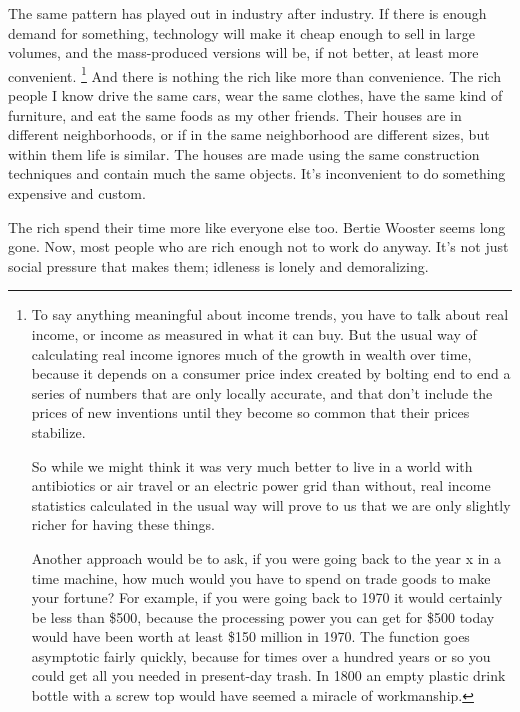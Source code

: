 \documentclass[12pt]{book}
\begin{document}
The same pattern has played out in industry after industry. If there is
enough demand for something, technology will make it cheap enough to
sell in large volumes, and the mass-produced versions will be, if not
better, at least more convenient. \footnote{To say anything meaningful about income trends, you have to
talk about real income, or income as measured in what it can buy. But
the usual way of calculating real income ignores much of the growth in
wealth over time, because it depends on a consumer price index created
by bolting end to end a series of numbers that are only locally
accurate, and that don't include the prices of new inventions until they
become so common that their prices stabilize.

So while we might think it was very much better to live in a world with
antibiotics or air travel or an electric power grid than without, real
income statistics calculated in the usual way will prove to us that we
are only slightly richer for having these things.

Another approach would be to ask, if you were going back to the year x
in a time machine, how much would you have to spend on trade goods to
make your fortune? For example, if you were going back to 1970 it would
certainly be less than \$500, because the processing power you can get
for \$500 today would have been worth at least \$150 million in 1970.
The function goes asymptotic fairly quickly, because for times over a
hundred years or so you could get all you needed in present-day trash.
In 1800 an empty plastic drink bottle with a screw top would have seemed
a miracle of workmanship.} And there is
nothing the rich like more than convenience. The rich people I know
drive the same cars, wear the same clothes, have the same kind of
furniture, and eat the same foods as my other friends. Their houses are
in different neighborhoods, or if in the same neighborhood are different
sizes, but within them life is similar. The houses are made using the
same construction techniques and contain much the same objects. It's
inconvenient to do something expensive and custom.

The rich spend their time more like everyone else too. Bertie Wooster
seems long gone. Now, most people who are rich enough not to work do
anyway. It's not just social pressure that makes them; idleness is
lonely and demoralizing.
\end{document}

